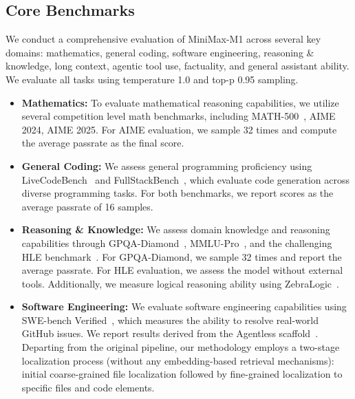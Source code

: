 \subsection{Core Benchmarks} 


We conduct a comprehensive evaluation of MiniMax-M1 across several key domains: mathematics, general coding, software engineering, reasoning \& knowledge, long context, agentic tool use, factuality, and general assistant ability. We evaluate all tasks using temperature 1.0 and top-p 0.95 sampling.

\begin{itemize}
    \item \textbf{Mathematics:} To evaluate mathematical reasoning capabilities, we utilize several competition level math benchmarks, including MATH-500~\citep{hendrycks2021measuring},  AIME 2024, AIME 2025. For AIME evaluation, we sample 32 times and compute the average passrate as the final score.
    

     \item \textbf{General Coding:} We assess general programming proficiency using LiveCodeBench~\citep{jainlivecodebench} and FullStackBench~\citep{liu2024fullstackbenchevaluatingllms}, which evaluate code generation across diverse programming tasks. For both benchmarks, we report scores as the average passrate of 16 samples.
     
     \item \textbf{Reasoning \& Knowledge:} We assess domain knowledge and reasoning capabilities through GPQA-Diamond~\citep{rein2024gpqa}, MMLU-Pro~\citep{wang2024mmlu}, and the challenging HLE benchmark~\citep{phan2025humanity}. For GPQA-Diamond, we sample 32 times and report the average passrate.
     For HLE evaluation, we assess the model without external tools. Additionally, we measure logical reasoning ability using ZebraLogic~\citep{lin2025zebralogic}.

    \item \textbf{Software Engineering:} We evaluate software engineering capabilities using SWE-bench Verified~\citep{jimenez2024swebenchlanguagemodelsresolve}, which measures the ability to resolve real-world GitHub issues. We report results derived from the Agentless scaffold~\citep{xia2024agentless}. Departing from the original pipeline, our methodology employs a two-stage localization process (without any embedding-based retrieval mechanisms): initial coarse-grained file localization followed by fine-grained localization to specific files and code elements.
        

\end{itemize}
